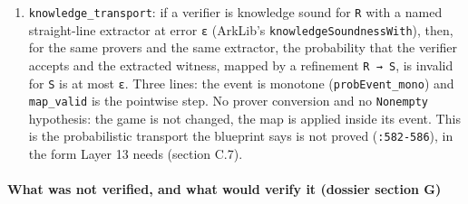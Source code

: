 \begin{enumerate}
\item \texttt{knowledge\_\allowbreak{}transport}: if a verifier is knowledge sound for \texttt{R} with a named straight-line extractor at error \texttt{ε} (ArkLib's \texttt{knowledgeSoundnessWith}), then, for the same provers and the same extractor, the probability that the verifier accepts and the extracted witness, mapped by a refinement \texttt{R → S}, is invalid for \texttt{S} is at most \texttt{ε}. Three lines: the event is monotone (\texttt{probEvent\_\allowbreak{}mono}) and \texttt{map\_\allowbreak{}valid} is the pointwise step. No prover conversion and no \texttt{Nonempty} hypothesis: the game is not changed, the map is applied inside its event. This is the probabilistic transport the blueprint says is not proved (\texttt{:582-{}586}), in the form Layer 13 needs (section C.7).
\end{enumerate}

\paragraph{What was not verified, and what would verify it (dossier section G)}\label{sec:gen-spine-G}

